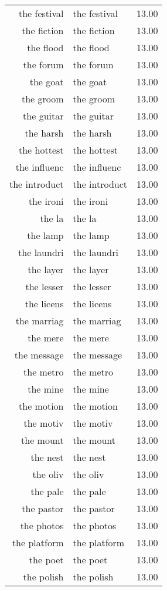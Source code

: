 \begin{table}[ht]
\begin{tabular}{rlr}
  the festival & the festival & 13.00 \\ 
  the fiction & the fiction & 13.00 \\ 
  the flood & the flood & 13.00 \\ 
  the forum & the forum & 13.00 \\ 
  the goat & the goat & 13.00 \\ 
  the groom & the groom & 13.00 \\ 
  the guitar & the guitar & 13.00 \\ 
  the harsh & the harsh & 13.00 \\ 
  the hottest & the hottest & 13.00 \\ 
  the influenc & the influenc & 13.00 \\ 
  the introduct & the introduct & 13.00 \\ 
  the ironi & the ironi & 13.00 \\ 
  the la & the la & 13.00 \\ 
  the lamp & the lamp & 13.00 \\ 
  the laundri & the laundri & 13.00 \\ 
  the layer & the layer & 13.00 \\ 
  the lesser & the lesser & 13.00 \\ 
  the licens & the licens & 13.00 \\ 
  the marriag & the marriag & 13.00 \\ 
  the mere & the mere & 13.00 \\ 
  the message & the message & 13.00 \\ 
  the metro & the metro & 13.00 \\ 
  the mine & the mine & 13.00 \\ 
  the motion & the motion & 13.00 \\ 
  the motiv & the motiv & 13.00 \\ 
  the mount & the mount & 13.00 \\ 
  the nest & the nest & 13.00 \\ 
  the oliv & the oliv & 13.00 \\ 
  the pale & the pale & 13.00 \\ 
  the pastor & the pastor & 13.00 \\ 
  the photos & the photos & 13.00 \\ 
  the platform & the platform & 13.00 \\ 
  the poet & the poet & 13.00 \\ 
  the polish & the polish & 13.00 \\ 

\end{tabular}
\end{table}
